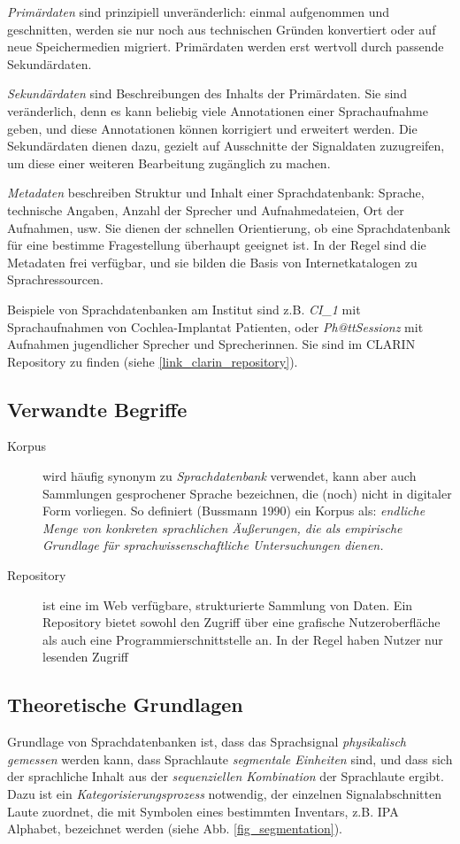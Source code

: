 \documentclass[11pt]{book}
\begin{document}
{\em Primärdaten} sind prinzipiell unveränderlich: einmal aufgenommen und geschnitten, werden sie nur noch aus technischen Gründen konvertiert oder auf neue Speichermedien migriert. Primärdaten werden erst wertvoll durch passende Sekundärdaten.

{\em Sekundärdaten} sind Beschreibungen des Inhalts der Primärdaten. Sie sind veränderlich, denn es kann beliebig viele Annotationen einer Sprachaufnahme geben, und diese Annotationen können korrigiert und erweitert werden. Die Sekundärdaten dienen dazu, gezielt auf Ausschnitte der Signaldaten zuzugreifen, um diese einer weiteren Bearbeitung zugänglich zu machen. 

{\em Metadaten} beschreiben Struktur und Inhalt einer Sprachdatenbank: Sprache, technische Angaben, Anzahl der Sprecher und Aufnahmedateien, Ort der Aufnahmen, usw. Sie dienen der schnellen Orientierung, ob eine Sprachdatenbank für eine bestimme Fragestellung überhaupt geeignet ist. In der Regel sind die Metadaten frei verfügbar, und sie bilden die Basis von Internetkatalogen zu Sprachressourcen. 

Beispiele von Sprachdatenbanken am Institut sind z.B. {\em CI\_1} mit Sprachaufnahmen von Cochlea-Implantat Patienten, oder {\em Ph@ttSessionz} mit Aufnahmen jugendlicher Sprecher und Sprecherinnen. Sie sind im CLARIN Repository zu finden (siehe \ref{link_clarin_repository}).

\subsection*{Verwandte Begriffe}
\begin{description}
\item[Korpus]{wird häufig synonym zu {\em Sprachdatenbank} verwendet, kann aber auch Sammlungen gesprochener Sprache bezeichnen, die
(noch) nicht in digitaler Form vorliegen. So definiert (Bussmann 1990) ein Korpus als: {\em endliche Menge von konkreten sprachlichen Äußerungen, die als empirische Grundlage für sprachwissenschaftliche Untersuchungen dienen.}}
\item[Repository]{ist eine im Web verfügbare, strukturierte Sammlung von Daten. Ein Repository bietet sowohl den Zugriff über eine grafische Nutzeroberfläche als auch eine Programmierschnittstelle an. In der Regel haben Nutzer nur lesenden Zugriff}
\end{description}

\subsection*{Theoretische Grundlagen}
Grundlage von Sprachdatenbanken ist, dass das Sprachsignal {\em physikalisch gemessen} werden kann, dass Sprachlaute {\em segmentale Einheiten} sind, und dass sich der sprachliche Inhalt aus der {\em sequenziellen Kombination} der Sprachlaute ergibt. Dazu ist ein {\em Kategorisierungsprozess} notwendig, der einzelnen Signalabschnitten Laute zuordnet, die mit Symbolen eines bestimmten Inventars, z.B. IPA Alphabet, bezeichnet werden (siehe Abb. \ref{fig_segmentation}).
\end{document}
